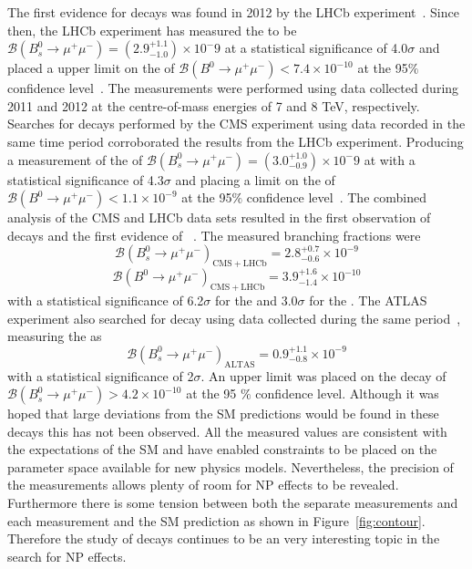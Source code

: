 The first evidence for \bsmumu decays was found in 2012 by the LHCb experiment~\cite{Aaij:2012nna}. Since then,
the LHCb experiment has measured the \bsmumu \BF to be $\mathcal{B}(B^{0}_{s} \to \mu^+ \mu^-) = (2.9^{+1.1}_{-1.0})\times 10^-9$ at a statistical significance of 4.0$\sigma$ and placed a upper limit on the \bdmumu \BF of $\mathcal{B}(B^{0} \to \mu^+ \mu^-) < 7.4 \times 10^{-10}$ at the 95$\%$ confidence level~\cite{Aaij:2013aka}. The measurements were performed using data collected during 2011 and 2012 at the centre-of-mass energies of 7 and 8 TeV, respectively. Searches for \bmumu decays performed by the CMS experiment using data recorded in the same time period corroborated the results from the LHCb experiment. Producing a measurement of the \bsmumu \BF of $\mathcal{B}(B^{0}_{s} \to \mu^+ \mu^-) = (3.0^{+1.0}_{-0.9})\times 10^-9$ at with a statistical significance of 4.3$\sigma$ and placing a limit on the \bdmumu \BF of $\mathcal{B}(B^{0} \to \mu^+ \mu^-) < 1.1 \times 10^{-9}$ at the 95$\%$ confidence level~\cite{Chatrchyan:2013bka}. 
The combined analysis of the CMS and LHCb data sets resulted in the first observation of \bsmumu decays and the first evidence of \bdmumu~\cite{CMS:2014xfa}. The measured branching fractions were 
\begin{equation}
\mathcal{B}(B^{0}_{s} \to \mu^+ \mu^-)_{\mathrm{CMS + LHCb}}  = 2.8^{+0.7}_{-0.6} \times 10^{-9}
\end{equation}
\begin{equation}
\mathcal{B}(B^{0} \to \mu^+ \mu^-)_{\mathrm{CMS + LHCb}}  = 3.9^{+1.6}_{-1.4} \times 10^{-10}
\end{equation}
with a statistical significance of 6.2$\sigma$ for the \bs and 3.0$\sigma$ for the \bd. The ATLAS experiment also searched for \bmumu decay using data collected during the same period~\cite{Aaboud:2016ire}, measuring the \bsmumu \BF as 
\begin{equation}
\mathcal{B}(B^{0}_{s} \to \mu^+ \mu^-)_{\mathrm{ALTAS}}  = 0.9^{+1.1}_{-0.8} \times 10^{-9}
\end{equation}
with a statistical significance of 2$\sigma$. An upper limit was placed on the \bdmumu decay of $\mathcal{B}(B^{0}_{s} \to \mu^+ \mu^-) >4.2 \times 10^{-10}$ at the 95 $\%$ confidence level.
Although it was hoped that large deviations from the SM predictions would be found in these decays this has not been observed. 
All the measured values are consistent with the expectations of the SM and have enabled constraints to be placed on the parameter space available for new physics models. Nevertheless, the precision of the measurements allows plenty of room for NP effects to be revealed. Furthermore there is some tension between both the separate measurements and each measurement and the SM prediction as shown in Figure~\ref{fig:contour}. Therefore the study of \bmumu decays continues to be an very interesting topic in the search for NP effects. 
 
